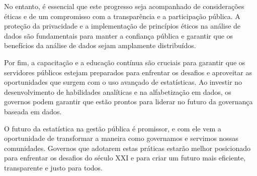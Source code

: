 No entanto, é essencial que este progresso seja acompanhado de considerações éticas e de um compromisso com a transparência e a participação pública. A proteção da privacidade e a implementação de princípios éticos na análise de dados são fundamentais para manter a confiança pública e garantir que os benefícios da análise de dados sejam amplamente distribuídos.\vskip0.3cm

Por fim, a capacitação e a educação contínua são cruciais para garantir que os servidores públicos estejam preparados para enfrentar os desafios e aproveitar as oportunidades que surgem com o uso avançado de estatísticas. Ao investir no desenvolvimento de habilidades analíticas e na alfabetização em dados, os governos podem garantir que estão prontos para liderar no futuro da governança baseada em dados.\vskip0.3cm

O futuro da estatística na gestão pública é promissor, e com ele vem a oportunidade de transformar a maneira como governamos e servimos nossas comunidades. Governos que adotarem estas práticas estarão melhor posicionado para enfrentar os desafios do século XXI e para criar um futuro mais eficiente, transparente e justo para todos.